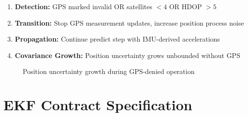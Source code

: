 \begin{enumerate}
    \item \textbf{Detection:} GPS marked invalid OR satellites $< 4$ OR HDOP $> 5$
    \item \textbf{Transition:} Stop GPS measurement updates, increase position process noise
    \item \textbf{Propagation:} Continue predict step with IMU-derived accelerations
    \item \textbf{Covariance Growth:} Position uncertainty grows unbounded without GPS
\end{enumerate}

\begin{figure}[htbp]
    \centering
    \caption{Position uncertainty growth during GPS-denied operation}
    \label{fig:gps_denied}
\end{figure}

\section{EKF Contract Specification}

